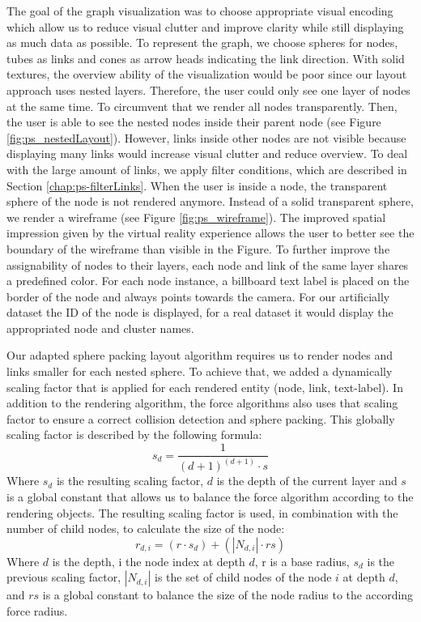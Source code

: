 The goal of the graph visualization was to choose appropriate visual encoding which allow us to reduce visual clutter and improve clarity while still displaying as much data as possible.
To represent the graph, we choose spheres for nodes, tubes as links and cones as arrow heads indicating the link direction.
With solid textures, the overview ability of the visualization would be poor since our layout approach uses nested layers. Therefore, the user could only see one layer of nodes at the same time. To circumvent that we render all nodes transparently. Then, the user is able to see the nested nodes inside their parent node (see Figure \ref{fig:ps_nestedLayout}). 
However, links inside other nodes are not visible because displaying many links would increase visual clutter and reduce overview. To deal with the large amount of links, we apply filter conditions, which are described in Section \ref{chap:ps-filterLinks}.
When the user is inside a node, the transparent sphere of the node is not rendered anymore. Instead of a solid transparent sphere, we render a wireframe (see Figure \ref{fig:ps_wireframe}). The improved spatial impression given by the virtual reality experience allows the user to better see the boundary of the wireframe than visible in the Figure. To further improve the assignability of nodes to their layers, each node and link of the same layer shares a predefined color.
For each node instance, a billboard text label is placed on the border of the node and always points towards the camera. For our artificially dataset the ID of the node is displayed, for a real dataset it would display the appropriated node and cluster names.

Our adapted sphere packing layout algorithm requires us to render nodes and links smaller for each nested sphere. To achieve that, we added a dynamically scaling factor that is applied for each rendered entity (node, link, text-label). 
In addition to the rendering algorithm, the force algorithms also uses that scaling factor to ensure a correct collision detection and sphere packing. 
This globally scaling factor is described by the following formula: 
\begin{equation}
    s_{ d } = \frac{1}{(d+1)^{(d+1)} \cdot s}
\end{equation}
Where $s_{ d }$ is the resulting scaling factor, $d$ is the depth of the current layer and $s$ is a global constant that allows us to balance the force algorithm according to the rendering objects. The resulting scaling factor is used, in combination with the number of child nodes, to calculate the size of the node: 
\begin{equation}
    r_{ d,i } = (r \cdot s_{ d }) + (\left\lvert N_{ d,i } \right\rvert \cdot rs)
\end{equation}
Where $d$ is the depth, i the node index at depth $d$, r is a base radius, $s_{ d }$ is the previous scaling factor, $\left\lvert N_{ d,i } \right\rvert$ is the set of child nodes of the node $i$ at depth $d$, and $rs$ is a global constant to balance the size of the node radius to the according force radius.

